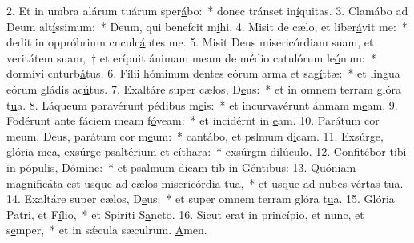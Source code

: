 2. Et in umbra alárum tuárum sper\uline{á}bo:~* donec tránset in\uline{í}quitas.
3. Clamábo ad Deum alt\uline{í}ssimum:~* Deum, qui benefcit m\uline{i}hi.
4. Misit de cælo, et liber\uline{á}vit me:~* dedit in oppróbrium cnculc\uline{á}ntes me.
5. Misit Deus misericórdiam suam, et veritátem suam,~† et erípuit ánimam meam de médio catulórum le\uline{ó}num:~* dormívi cnturb\uline{á}tus.
6. Fílii hóminum dentes eórum arma et sag\uline{í}ttæ:~* et lingua eórum gládis ac\uline{ú}tus.
7. Exaltáre super cælos, D\uline{e}us:~* et in omnem terram glóra t\uline{u}a.
8. Láqueum paravérunt pédibus m\uline{e}is:~* et incurvavérunt ánmam m\uline{e}am.
9. Fodérunt ante fáciem meam f\uline{ó}veam:~* et incidérnt in \uline{e}am.
10. Parátum cor meum, Deus, parátum cor m\uline{e}um:~* cantábo, et pslmum d\uline{i}cam.
11. Exsúrge, glória mea, exsúrge psaltérium et c\uline{í}thara:~* exsúrgm dil\uline{ú}culo.
12. Confitébor tibi in pópulis, D\uline{ó}mine:~* et psalmum dicam tib in G\uline{é}ntibus:
13. Quóniam magnificáta est usque ad cælos misericórdia t\uline{u}a,~* et usque ad nubes vértas t\uline{u}a.
14. Exaltáre super cælos, D\uline{e}us:~* et super omnem terram glóra t\uline{u}a.
15. Glória Patri, et F\uline{í}lio,~* et Spiríti S\uline{a}ncto.
16. Sicut erat in princípio, et nunc, et s\uline{e}mper,~* et in sǽcula sæculrum. \uline{A}men.
